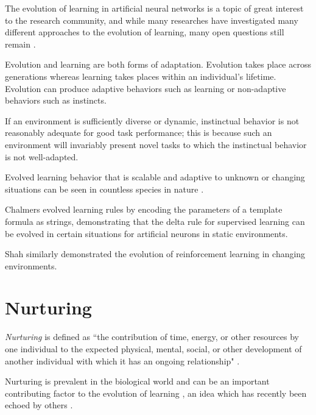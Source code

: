 \documentclass[master]{outhesis}
\begin{document}
The evolution of learning in artificial neural networks is a topic of great interest to the research community, 
and while many researches have investigated many different approaches to the evolution of learning,
many open questions still remain \cite{Soltoggio:2017bl}.

Evolution and learning are both forms of adaptation.
Evolution takes place across generations whereas learning takes places within an individual's lifetime.
Evolution can produce adaptive behaviors such as learning or non-adaptive behaviors such as instincts.

If an environment is sufficiently diverse or dynamic, instinctual behavior is not reasonably adequate for good task performance;
this is because such an environment will invariably present novel tasks to which the instinctual behavior is not well-adapted.

Evolved learning behavior that is scalable and adaptive to unknown or changing situations can be seen in countless species in nature \cite{Shah:2015hs}.

Chalmers \cite{chalmers-evolution-learning} evolved learning rules by encoding the parameters of a template formula as strings, demonstrating that the delta rule for supervised learning can be evolved in certain situations for artificial neurons in static environments.


Shah \cite{Shah:2015hs} similarly demonstrated the evolution of reinforcement learning in changing environments.

\section{Nurturing}

\emph{Nurturing} is defined as ``the contribution of time, energy, or other resources by one individual to the expected physical, mental, social, or other development of another individual with which it has an ongoing relationship" \cite{nurturing-definition}.

Nurturing is prevalent in the biological world and can be an important contributing factor to the evolution of learning \cite{nurturing-definition} \cite{eskridge-learning-uncertain-environments},
an idea which has recently been echoed by others \cite{Soltoggio:2017bl}.
\end{document}

